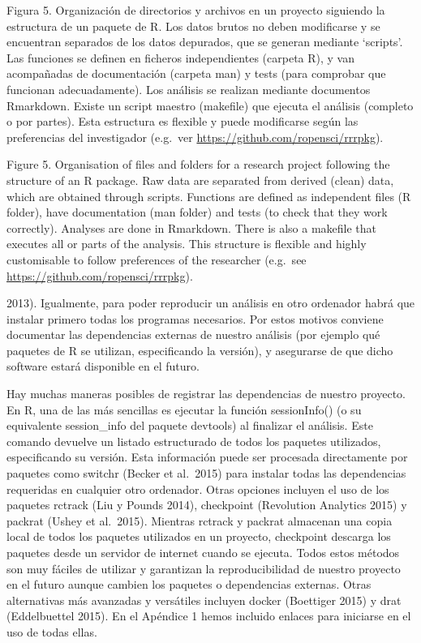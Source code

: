 \documentclass[]{tufte-handout}
\begin{document}
Figura 5. Organización de directorios y archivos en un proyecto
siguiendo la estructura de un paquete de R. Los datos brutos no deben
modificarse y se encuentran separados de los datos depurados, que se
generan mediante `scripts'. Las funciones se definen en ficheros
independientes (carpeta R), y van acompañadas de documentación (carpeta
man) y tests (para comprobar que funcionan adecuadamente). Los análisis
se realizan mediante documentos Rmarkdown. Existe un script maestro
(makefile) que ejecuta el análisis (completo o por partes). Esta
estructura es flexible y puede modificarse según las preferencias del
investigador (e.g.~ver \url{https://github.com/ropensci/rrrpkg}).

Figure 5. Organisation of files and folders for a research project
following the structure of an R package. Raw data are separated from
derived (clean) data, which are obtained through scripts. Functions are
defined as independent files (R folder), have documentation (man folder)
and tests (to check that they work correctly). Analyses are done in
Rmarkdown. There is also a makefile that executes all or parts of the
analysis. This structure is flexible and highly customisable to follow
preferences of the researcher (e.g.~see
\url{https://github.com/ropensci/rrrpkg}).

2013). Igualmente, para poder reproducir un análisis en otro ordenador
habrá que instalar primero todas los programas necesarios. Por estos
motivos conviene documentar las dependencias externas de nuestro
análisis (por ejemplo qué paquetes de R se utilizan, especificando la
versión), y asegurarse de que dicho software estará disponible en el
futuro.

Hay muchas maneras posibles de registrar las dependencias de nuestro
proyecto. En R, una de las más sencillas es ejecutar la función
sessionInfo() (o su equivalente session\_info del paquete devtools) al
finalizar el análisis. Este comando devuelve un listado estructurado de
todos los paquetes utilizados, especificando su versión. Esta
información puede ser procesada directamente por paquetes como switchr
(Becker et al.~2015) para instalar todas las dependencias requeridas en
cualquier otro ordenador. Otras opciones incluyen el uso de los paquetes
rctrack (Liu y Pounds 2014), checkpoint (Revolution Analytics 2015) y
packrat (Ushey et al.~2015). Mientras rctrack y packrat almacenan una
copia local de todos los paquetes utilizados en un proyecto, checkpoint
descarga los paquetes desde un servidor de internet cuando se ejecuta.
Todos estos métodos son muy fáciles de utilizar y garantizan la
reproducibilidad de nuestro proyecto en el futuro aunque cambien los
paquetes o dependencias externas. Otras alternativas más avanzadas y
versátiles incluyen docker (Boettiger 2015) y drat (Eddelbuettel 2015).
En el Apéndice 1 hemos incluido enlaces para iniciarse en el uso de
todas ellas.
\end{document}
